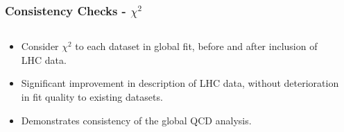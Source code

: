 \documentclass[10pt]{beamer}
\begin{document}
\begin{frame}
\frametitle{Consistency Checks - $\chi^2$}

\begin{columns}
  \begin{column}{0.4\textwidth}
\small
 \begin{itemize}
\item<1-> Consider $\chi^2$ to each dataset in global fit, before and after inclusion of LHC data. \vskip20pt
\item<1-> Significant improvement in description of LHC data, without deterioration in fit quality to existing datasets.\vskip20pt
\item<1-> Demonstrates consistency of the global QCD analysis.

\end{itemize}
\end{column}

  \begin{column}{0.6\textwidth}


\end{column}
\end{columns}
\end{frame}
\end{document}
